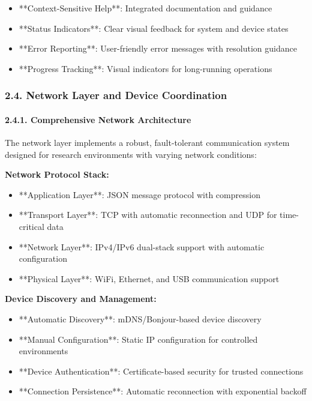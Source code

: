\documentclass[11pt,a4paper]{article}
\begin{document}
\begin{itemize}
\item **Context-Sensitive Help**: Integrated documentation and guidance
\item **Status Indicators**: Clear visual feedback for system and device states
\item **Error Reporting**: User-friendly error messages with resolution guidance
\item **Progress Tracking**: Visual indicators for long-running operations

\end{itemize}
\subsubsection{2.4. Network Layer and Device Coordination}

\paragraph{2.4.1. Comprehensive Network Architecture}

The network layer implements a robust, fault-tolerant communication system designed for research environments with
varying network conditions:

\textbf{Network Protocol Stack:}

\begin{itemize}
\item **Application Layer**: JSON message protocol with compression
\item **Transport Layer**: TCP with automatic reconnection and UDP for time-critical data
\item **Network Layer**: IPv4/IPv6 dual-stack support with automatic configuration
\item **Physical Layer**: WiFi, Ethernet, and USB communication support

\end{itemize}
\textbf{Device Discovery and Management:}

\begin{itemize}
\item **Automatic Discovery**: mDNS/Bonjour-based device discovery
\item **Manual Configuration**: Static IP configuration for controlled environments
\item **Device Authentication**: Certificate-based security for trusted connections
\item **Connection Persistence**: Automatic reconnection with exponential backoff

\end{itemize}
\end{document}

